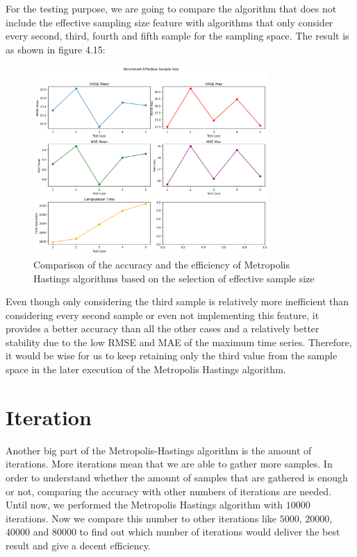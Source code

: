 For the testing purpose, we are going to compare the algorithm that does not include the effective sampling size feature with algorithms that only consider every second, third, fourth and fifth sample for the sampling space. The result is as shown in figure 4.15:

\begin{figure}
    \centering
    \includegraphics[width=0.8\textwidth]{figures/basic_mh/benchmark/effective_sample_size.png}
    \captionsetup{width=.8\textwidth}
    \caption{Comparison of the accuracy and the efficiency of Metropolis Hastings algorithms based on the selection of effective sample size}
    \label{fig:enter-label}
\end{figure}

Even though only considering the third sample is relatively  more inefficient than considering every second sample or even not implementing this feature, it provides a better accuracy than all the other cases and a relatively better stability due to the low RMSE and MAE of the maximum time series. Therefore, it would be wise for us to keep retaining only the third value from the sample space in the later execution of the Metropolis Hastings algorithm.

\section{Iteration}
Another big part of the Metropolis-Hastings algorithm is the amount of iterations. More iterations mean that we are able to gather more samples. In order to understand whether the amount of samples that are gathered is enough or not, comparing the accuracy with other numbers of iterations are needed. Until now, we performed the Metropolis Hastings algorithm with $10000$ iterations. Now we compare this number to other iterations like $5000$, $20000$, $40000$ and $80000$ to find out which number of iterations would deliver the best result and give a decent efficiency.

